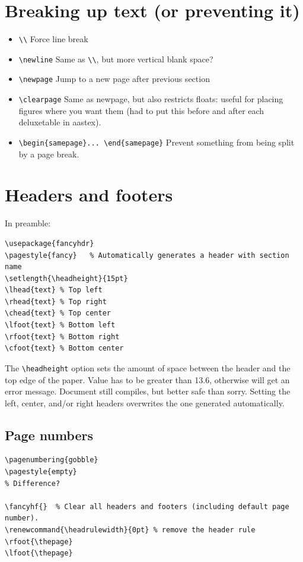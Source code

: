 \documentclass{article}
\begin{document}
\section{Breaking up text (or preventing it)}
\begin{itemize}
    \item \verb|\\| Force line break
    \item \verb|\newline| Same as \verb|\\|, but more vertical blank space?
    \item \verb|\newpage| Jump to a new page after previous section
    \item \verb|\clearpage| Same as newpage, but also restricts floats: useful
        for placing figures where you want them (had to put this before and after
        each deluxetable in aastex).
    \item \verb|\begin{samepage}... \end{samepage}| Prevent something from
        being split by a page break.
\end{itemize}

\section{Headers and footers}\label{headfoot}
In preamble:
\begin{lstlisting}
\usepackage{fancyhdr}
\pagestyle{fancy}   % Automatically generates a header with section name
\setlength{\headheight}{15pt}
\lhead{text} % Top left
\rhead{text} % Top right
\chead{text} % Top center
\lfoot{text} % Bottom left
\rfoot{text} % Bottom right
\cfoot{text} % Bottom center
\end{lstlisting}

The \verb|\headheight| option sets the amount of space between the
header and the top edge of the paper. Value has to be greater than
13.6, otherwise will get an error message. Document still
compiles, but better safe than sorry. Setting the left, center, and/or
right headers overwrites the one generated automatically.

\subsection{Page numbers}
\begin{lstlisting}
\pagenumbering{gobble}
\pagestyle{empty}
% Difference?

\fancyhf{}  % Clear all headers and footers (including default page number).
\renewcommand{\headrulewidth}{0pt} % remove the header rule
\rfoot{\thepage}
\lfoot{\thepage}
\end{lstlisting}
\end{document}
